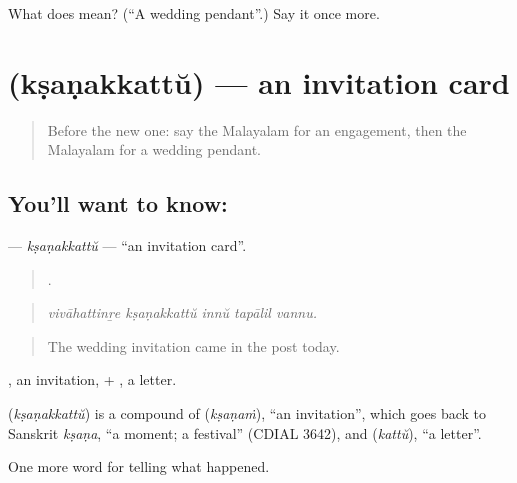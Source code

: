\begin{tcolorbox}[breakable,colback=teal!4,colframe=teal!35!black,title={Before you move on}]
What does  mean? (\textquotedblleft{}A wedding pendant\textquotedblright{}.) Say it once more.
\end{tcolorbox}
\section[\texorpdfstring{\ml{ക്ഷണക്കത്ത്} (kṣaṇakkattŭ)}{ക്ഷണക്കത്ത് (kṣaṇakkattŭ)}]{ (kṣaṇakkattŭ) — an invitation card}

\label{lesson:ML-C385-ksanakkattu}



\begin{quote}
Before the new one: say the Malayalam for an engagement, then the Malayalam for a wedding pendant.
\end{quote}

\subsection*{You'll want to know: }
\textbf{} — \emph{kṣaṇakkattŭ} — \textquotedblleft{}an invitation card\textquotedblright{}.

\begin{quote}
    .
\end{quote}

\begin{quote}
\emph{vivāhattinṟe kṣaṇakkattŭ innŭ tapālil vannu.}
\end{quote}

\begin{quote}
The wedding invitation came in the post today.
\end{quote}

, an invitation, + , a letter.

\begin{cousinweb}
\textbf{} (\emph{kṣaṇakkattŭ}) is a compound of  (\emph{kṣaṇaṁ}), \textquotedblleft{}an invitation\textquotedblright{}, which goes back to Sanskrit \emph{kṣaṇa}, \textquotedblleft{}a moment; a festival\textquotedblright{} (CDIAL 3642), and  (\emph{kattŭ}), \textquotedblleft{}a letter\textquotedblright{}.
\end{cousinweb}

\begin{grammarlens}[title={What you've built}]
One more word for telling what happened.
\end{grammarlens}

